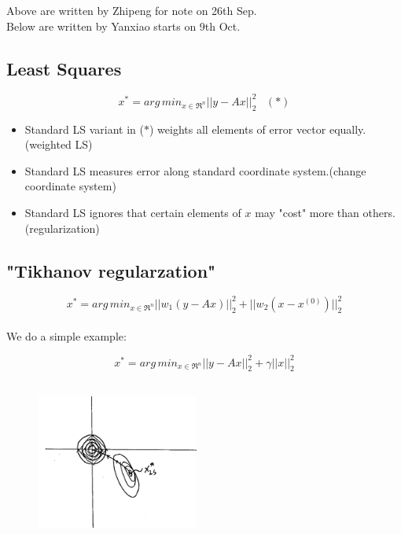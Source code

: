 Above are written by Zhipeng for note on 26th Sep. \\

Below are written by Yanxiao starts on 9th Oct. \\

\subsection{Least Squares}
\begin{equation*}
x^* = arg\, min_{x\in \Re^n}||y-Ax||_2^2 \,\,\,\,\, (*)
\end{equation*}

\begin{itemize}
	\item Standard LS variant in ($*$) weights all elements of error vector equally.(weighted LS)
	
	\item Standard LS measures error along standard coordinate system.(change coordinate system)
	
	\item Standard LS ignores that certain elements of $x$ may "cost" more than others.(regularization)
\end{itemize}

\subsection{"Tikhanov regularzation"}
\begin{equation*}
x^* =arg\,min_{x\in \Re^n}||w_1(y-Ax)||_2^2 + ||w_2(x - x^{(0)})||_2^2
\end{equation*}\\

We do a simple example:

\begin{equation*}
x^* = arg\,min_{x\in \Re^n}||y-Ax||_2^2 + \gamma||x||_2^2
\end{equation*}

\begin{figure}
	\centering
	\includegraphics[width=2.1in,height=2.1in]{figures/ch06/figure4.png}
\end{figure}

